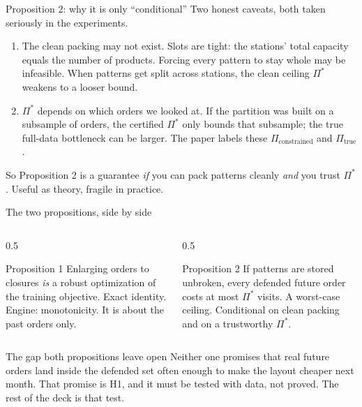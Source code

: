 \documentclass[11pt,aspectratio=169]{beamer}
\newcommand{\bd}[1]{\textcolor{bad}{#1}}
\begin{document}
\begin{frame}{Proposition 2: why it is only ``conditional''}
  Two honest caveats, both taken seriously in the experiments.
  \begin{enumerate}
    \item \bd{The clean packing may not exist.} Slots are tight: the stations' total capacity equals the number of products. Forcing every pattern to stay whole may be infeasible. When patterns get split across stations, the clean ceiling $\Pi^*$ weakens to a looser bound.
    \item \bd{$\Pi^*$ depends on which orders we looked at.} If the partition was built on a subsample of orders, the certified $\Pi^*$ only bounds that subsample; the true full-data bottleneck can be larger. The paper labels these $\Pi_{\text{constrained}}$ and $\Pi_{\text{true}}$.
  \end{enumerate}
  So Proposition 2 is a guarantee \emph{if} you can pack patterns cleanly \emph{and} you trust $\Pi^*$. Useful as theory, fragile in practice.
\end{frame}

\begin{frame}{The two propositions, side by side}
  \begin{columns}
  \begin{column}{0.5\textwidth}
  \begin{block}{Proposition 1}
  Enlarging orders to closures \emph{is} a robust optimization of the training objective. Exact identity. Engine: monotonicity. It is about the past orders only.
  \end{block}
  \end{column}
  \begin{column}{0.5\textwidth}
  \begin{block}{Proposition 2}
  If patterns are stored unbroken, every defended future order costs at most $\Pi^*$ visits. A worst-case ceiling. Conditional on clean packing and on a trustworthy $\Pi^*$.
  \end{block}
  \end{column}
  \end{columns}
  \vspace{2mm}
  \begin{alertblock}{The gap both propositions leave open}
  Neither one promises that real future orders land inside the defended set often enough to make the layout cheaper next month. That promise is H1, and it must be tested with data, not proved. The rest of the deck is that test.
  \end{alertblock}
\end{frame}
\end{document}
